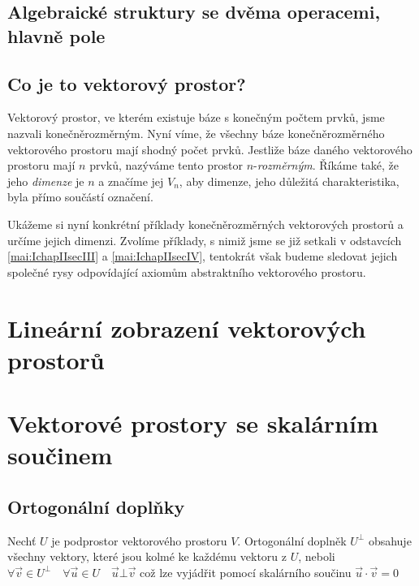         
        
      \subsection{Algebraické struktury se dvěma operacemi, hlavně pole}
      
      \subsection{Co je to vektorový prostor?}
        Vektorový  prostor, ve kterém existuje báze s konečným počtem prvků, jsme nazvali
        konečněrozměrným. Nyní víme, že všechny báze konečněrozměrného vektorového prostoru mají
        shodný počet prvků. Jestliže báze daného vektorového prostoru mají \(n\) prvků, nazýváme
        tento prostor \(n\)-\emph{rozměrným}. Říkáme také, že jeho \emph{dimenze} je \(n\) a značíme
        jej \(V_n\), aby dimenze, jeho důležitá charakteristika, byla přímo součástí označení.
        
        Ukážeme si nyní konkrétní příklady konečněrozměrných vektorových prostorů a určíme jejich
        dimenzi. Zvolíme příklady, s nimiž jsme se již setkali v odstavcích
        \ref{mai:IchapIIsecIII} a \ref{mai:IchapIIsecIV}, tentokrát však budeme sledovat jejich
        společné rysy odpovídající axiomům abstraktního vektorového prostoru. 
        

  \section{Lineární zobrazení vektorových prostorů}\label{mai:IIchapIsecII}
  \section{Vektorové prostory se skalárním součinem}
    \subsection{Ortogonální doplňky}
      Nechť \(U\) je podprostor vektorového prostoru \(V\). Ortogonální doplněk $U^\bot$ obsahuje 
      všechny vektory, které jsou kolmé ke každému vektoru z \(U\), neboli \(\forall\vec{v}\in 
      U^\bot\quad \forall\vec{u}\in U\quad \vec{u}\bot\vec{v}\) což lze vyjádřit pomocí skalárního 
      součinu \(\vec{u}\cdot\vec{v} = 0\)


